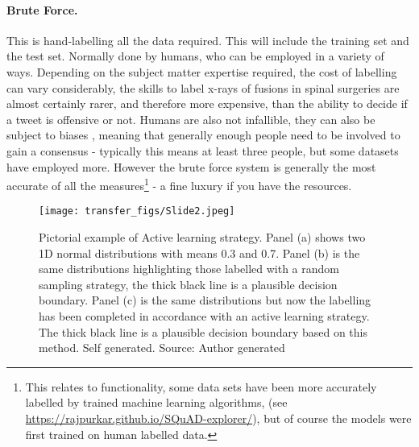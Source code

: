 \paragraph{Brute Force.} This is hand-labelling all the data required. This will include the training set and the test set. Normally done by humans, who can be employed in a variety of ways. Depending on the subject matter expertise required, the cost of labelling can vary considerably, the skills to label x-rays of fusions in spinal surgeries are almost certainly rarer, and therefore  more expensive, than the ability to decide if a tweet is offensive or not. Humans are also not infallible, they can also be subject to biases \parencite{kahneman2011thinking}, meaning that generally enough people need to be involved to gain a consensus - typically this means at least three people, but some datasets have employed more. However the brute force system is generally the most accurate of all the measures\footnote{This relates to  functionality, some data sets have been more accurately labelled by trained machine learning algorithms, (see \url{https://rajpurkar.github.io/SQuAD-explorer/}), but of course the models were first trained on human labelled data.}  - a fine luxury if you have the resources.

\begin{figure}
  \texttt{[image: transfer\_figs/Slide2.jpeg]}
  \caption[Pictorial example of Active learning strategy.]{Pictorial example of Active learning strategy. Panel (a) shows two 1D normal distributions with means 0.3 and 0.7. Panel (b) is the same distributions highlighting those labelled with a random sampling strategy, the thick black line is a plausible decision boundary. Panel (c) is the same distributions but now the labelling has been completed in accordance with an active learning strategy. The thick black line is a plausible decision boundary based on this method. Self generated. Source: Author generated}
  \label{fig:active}
\end{figure}



